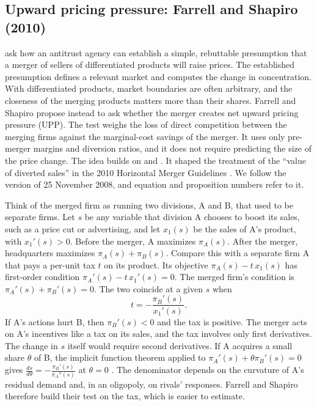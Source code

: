 \subsection{Upward pricing pressure: Farrell and Shapiro (2010)}\label{sec:11-uppfs}

 \citet{FarrellShapiro2010} ask how an antitrust agency can establish a simple, rebuttable
presumption that a merger of sellers of differentiated products will raise prices. The established presumption
defines a relevant market and computes the change in concentration. With differentiated products, market boundaries
are often arbitrary, and the closeness of the merging products matters more than their shares. Farrell and Shapiro
propose instead to ask whether the merger creates net upward pricing pressure (UPP). The test weighs the loss of
direct competition between the merging firms against the marginal-cost savings of the merger. It uses only
pre-merger margins and diversion ratios, and it does not require predicting the size of the price change. The idea
builds on \citet{Werden1996} and \citet{OBrienSalop2000}. It shaped the treatment of the ``value of diverted
sales'' in the 2010 Horizontal Merger Guidelines \citep{USDOJFTC2010}. We follow the version of 25 November 2008, and
equation and proposition numbers refer to it.

 Think of the merged firm as running two divisions, A and B, that used to be separate
firms. Let $s$ be any variable that division A chooses to boost its sales, such as a price cut or advertising, and let
$x_1(s)$ be the sales of A's product, with $x_1'(s) > 0$. Before the merger, A maximizes $\pi_A(s)$. After the
merger, headquarters maximizes $\pi_A(s) + \pi_B(s)$. Compare this with a separate firm A that pays a per-unit tax $t$
on its product. Its objective $\pi_A(s) - t\,x_1(s)$ has first-order condition $\pi_A'(s) - t\,x_1'(s) = 0$. The
merged firm's condition is $\pi_A'(s) + \pi_B'(s) = 0$. The two coincide at a given $s$ when
\begin{equation}\label{eq:11-tax-general}
  t = -\frac{\pi_B'(s)}{x_1'(s)} .
\end{equation}
If A's actions hurt B, then $\pi_B'(s) < 0$ and the tax is positive. The merger acts on A's incentives like a tax on
its sales, and the tax involves only first derivatives. The change in $s$ itself would require second derivatives. If
A acquires a small share $\theta$ of B, the implicit function theorem applied to $\pi_A'(s) + \theta\pi_B'(s) = 0$
gives $\frac{ds}{d\theta} = -\frac{\pi_B'(s)}{\pi_A''(s)}$ at $\theta = 0$ \citep[fn.~22]{FarrellShapiro2010}. The
denominator depends on the curvature of A's residual demand and, in an oligopoly, on rivals' responses. Farrell and
Shapiro therefore build their test on the tax, which is easier to estimate.

